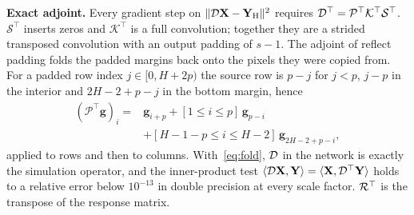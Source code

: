 \documentclass[journal]{IEEEtran}
\begin{document}
\textbf{Exact adjoint.} Every gradient step on $\|\mathcal{D}\mathbf{X}-\mathbf{Y}_{\mathrm{H}}\|^2$ requires $\mathcal{D}^{\top}=\mathcal{P}^{\top}\mathcal{K}^{\top}\mathcal{S}^{\top}$. $\mathcal{S}^{\top}$ inserts zeros and $\mathcal{K}^{\top}$ is a full convolution; together they are a strided transposed convolution with an output padding of $s-1$. The adjoint of reflect padding folds the padded margins back onto the pixels they were copied from. For a padded row index $j\in[0,H+2p)$ the source row is $p-j$ for $j<p$, $j-p$ in the interior and $2H-2+p-j$ in the bottom margin, hence
\begin{equation}
\begin{split}
(\mathcal{P}^{\top}\mathbf{g})_i={}&\mathbf{g}_{i+p}+[1\le i\le p]\,\mathbf{g}_{p-i}\\
&+[H-1-p\le i\le H-2]\,\mathbf{g}_{2H-2+p-i},
\end{split}
\label{eq:fold}
\end{equation}
applied to rows and then to columns. With~\eqref{eq:fold}, $\mathcal{D}$ in the network is exactly the simulation operator, and the inner-product test $\langle\mathcal{D}\mathbf{X},\mathbf{Y}\rangle=\langle\mathbf{X},\mathcal{D}^{\top}\mathbf{Y}\rangle$ holds to a relative error below $10^{-13}$ in double precision at every scale factor. $\mathcal{R}^{\top}$ is the transpose of the response matrix.
\end{document}
